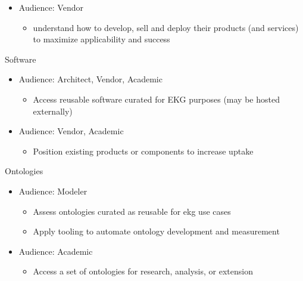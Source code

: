 \begin{basedescript}{%
    \desclabelstyle{\multilinelabel}
    \desclabelwidth{2cm}
}
\begin{itemize}
            \begin{itemize}
                \item Reduce the risk and cost associated with new \gls{ekg} projects
            \end{itemize}
            \item Audience: Vendor
            \begin{itemize}
                \item understand how to develop, sell and deploy their products (and services)
                  to maximize applicability and success
            \end{itemize}
        \end{itemize}
    \item[Software]
        \begin{itemize}
            \item Audience: Architect, Vendor, Academic
                \begin{itemize}
                    \item Access reusable software curated for EKG purposes (may be hosted externally)
                \end{itemize}
            \item Audience: Vendor, Academic
                \begin{itemize}
                    \item Position existing products or components to increase uptake
                \end{itemize}
        \end{itemize}
    \item[Ontologies]
        \begin{itemize}
            \item Audience: Modeler
                \begin{itemize}
                    \item Assess ontologies curated as reusable for \gls{ekg} use cases
                    \item Apply tooling to automate ontology development and measurement
                \end{itemize}
            \item Audience: Academic
                \begin{itemize}
                    \item Access a set of ontologies for research, analysis, or extension
                \end{itemize}
        \end{itemize}

\end{basedescript}
